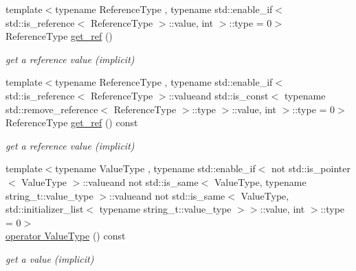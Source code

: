 \begin{DoxyCompactItemize}
{\footnotesize template$<$typename Reference\-Type , typename std\-::enable\-\_\-if$<$ std\-::is\-\_\-reference$<$ Reference\-Type $>$\-::value, int $>$\-::type  = 0$>$ }\\Reference\-Type \hyperlink{classnlohmann_1_1basic__json_a4f332e90f3cae562d0c3fa6ba48f74f9}{get\-\_\-ref} ()
\begin{DoxyCompactList}\small\item\em get a reference value (implicit) \end{DoxyCompactList}\item 
{\footnotesize template$<$typename Reference\-Type , typename std\-::enable\-\_\-if$<$ std\-::is\-\_\-reference$<$ Reference\-Type $>$\-::valueand std\-::is\-\_\-const$<$ typename std\-::remove\-\_\-reference$<$ Reference\-Type $>$\-::type $>$\-::value, int $>$\-::type  = 0$>$ }\\Reference\-Type \hyperlink{classnlohmann_1_1basic__json_aa669d997ddc03566de5438781254b32b}{get\-\_\-ref} () const 
\begin{DoxyCompactList}\small\item\em get a reference value (implicit) \end{DoxyCompactList}\item 
{\footnotesize template$<$typename Value\-Type , typename std\-::enable\-\_\-if$<$ not std\-::is\-\_\-pointer$<$ Value\-Type $>$\-::valueand not std\-::is\-\_\-same$<$ Value\-Type, typename string\-\_\-t\-::value\-\_\-type $>$\-::valueand not std\-::is\-\_\-same$<$ Value\-Type, std\-::initializer\-\_\-list$<$ typename string\-\_\-t\-::value\-\_\-type $>$$>$\-::value, int $>$\-::type  = 0$>$ }\\\hyperlink{classnlohmann_1_1basic__json_aef496a56163710084e13612ab73e6ed2}{operator Value\-Type} () const 
\begin{DoxyCompactList}\small\item\em get a value (implicit) \end{DoxyCompactList}\end{DoxyCompactItemize}
